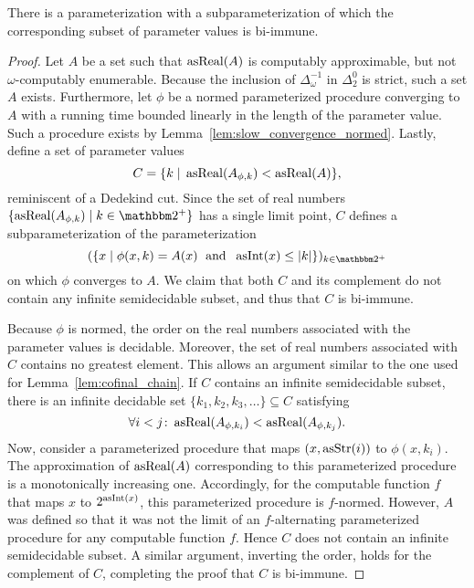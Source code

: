 \begin{lemma}
\label{lem:subparameterization_bi-immune}
  There is a parameterization with a subparameterization of which the corresponding subset of parameter values is bi-immune.
\end{lemma}
\begin{proof}
  Let $A$ be a set such that $\operatorname{asReal}(A)$ is computably approximable, but not $\omega$-computably enumerable.
  Because the inclusion of $\Delta^{-1}_\omega$ in $\Delta^0_2$ is strict, such a set $A$ exists.
  Furthermore, let $\phi$ be a normed parameterized procedure converging to $A$ with a running time bounded linearly in the length of the parameter value.
  Such a procedure exists by Lemma~\ref{lem:slow_convergence_normed}.
  Lastly, define a set of parameter values
  \begin{equation*}
    C = \{k \;{|}\; \operatorname{asReal}(A_{\phi,k}) < \operatorname{asReal}(A)\},
  \end{equation*}
  reminiscent of a Dedekind cut.
  Since the set of real numbers $\{\asReal(A_{\phi, k}) \st k \in \binary^+\}$ has a single limit point, $C$ defines a subparameterization of the parameterization
  \begin{equation*}
    (\{x \st \phi(x, k) = A(x) \reland \asNat(x) \le \length{k}\})_{k \in \binary^+}
  \end{equation*}
  on which $\phi$ converges to $A$.
  We claim that both $C$ and its complement do not contain any infinite semidecidable subset, and thus that $C$ is bi-immune.

  Because $\phi$ is normed, the order on the real numbers associated with the parameter values is decidable.
  Moreover, the set of real numbers associated with $C$ contains no greatest element.
  This allows an argument similar to the one used for Lemma~\ref{lem:cofinal_chain}.
  If $C$ contains an infinite semidecidable subset, there is an infinite decidable set $\{k_1, k_2, k_3, \ldots\} \subseteq C$ satisfying
  \begin{equation*}
    \forall i < j\colon \operatorname{asReal}(A_{\phi, k_i}) < \operatorname{asReal}(A_{\phi, k_j}).
  \end{equation*}
  Now, consider a parameterized procedure that maps $(x, \operatorname{asStr}(i))$ to $\phi(x, k_i)$.
  The approximation of $\operatorname{asReal}(A)$ corresponding to this parameterized procedure is a monotonically increasing one.
  Accordingly, for the computable function $f$ that maps $x$ to $2^{\operatorname{asInt}(x)}$, this parameterized procedure is $f$-normed.
  However, $A$ was defined so that it was not the limit of an $f$-alternating parameterized procedure for any computable function $f$.
  Hence $C$ does not contain an infinite semidecidable subset.
  A similar argument, inverting the order, holds for the complement of $C$, completing the proof that $C$ is bi-immune.
\end{proof}

